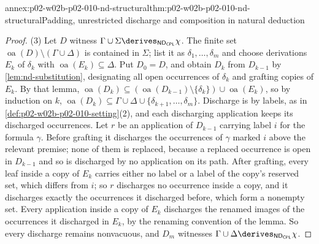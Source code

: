 \begin{annexitem}{annex:p02-w02b-p02-010-nd-structural}{thm:p02-w02b-p02-010-nd-structural}{Padding, unrestricted discharge and composition in natural deduction}
\begin{proof}
(3) Let \(D\) witness \(\Gamma\cup\Sigma\derives_{\mathsf{ND}_{\mathsf{CPL}}}\chi\).
The finite set \(\operatorname{oa}(D)\setminus(\Gamma\cup\Delta)\) is
contained in \(\Sigma\); list it as \(\delta_1,\ldots,\delta_m\) and choose
derivations \(E_k\) of \(\delta_k\) with
\(\operatorname{oa}(E_k)\subseteq\Delta\).  Put \(D_0=D\), and obtain \(D_k\)
from \(D_{k-1}\) by \cref{lem:nd-substitution}, designating all open
occurrences of \(\delta_k\) and grafting copies of \(E_k\).  By that lemma,
\(\operatorname{oa}(D_k)\subseteq(\operatorname{oa}(D_{k-1})\setminus\{\delta_k\})
\cup\operatorname{oa}(E_k)\), so by induction on \(k\),
\(\operatorname{oa}(D_k)\subseteq\Gamma\cup\Delta\cup\{\delta_{k+1},\ldots,\delta_m\}\).
Discharge is by labels, as in \cref{def:p02-w02b-p02-010-setting}(2), and
each discharging application keeps its discharged occurrences.  Let \(r\)
be an application of \(D_{k-1}\) carrying label \(i\) for the formula
\(\gamma\).  Before grafting it discharges the occurrences of
\(\gamma\) marked \(i\) above the relevant premise; none of them is
replaced, because a replaced occurrence is open in \(D_{k-1}\) and so is
discharged by no application on its path.  After grafting, every leaf
inside a copy of \(E_k\) carries either no label or a label of the copy's
reserved set, which differs from \(i\); so \(r\) discharges no occurrence
inside a copy, and it discharges exactly the occurrences it discharged
before, which form a nonempty set.  Every application inside a copy of
\(E_k\) discharges the renamed images of the occurrences it discharged in
\(E_k\), by the renaming convention of the lemma.  So every discharge
remains nonvacuous, and \(D_m\) witnesses
\(\Gamma\cup\Delta\derives_{\mathsf{ND}_{\mathsf{CPL}}}\chi\).
\end{proof}
\end{annexitem}

